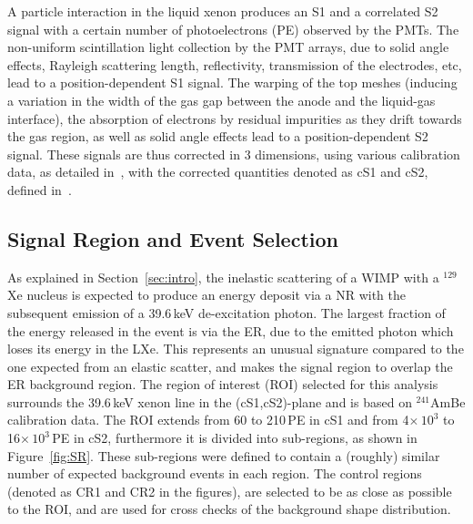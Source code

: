 A particle interaction in the liquid xenon produces an S1 and a correlated S2 signal with a certain number of photoelectrons (PE) observed by the PMTs. The non-uniform scintillation light collection by the PMT arrays, due to solid angle effects, Rayleigh scattering length, reflectivity, transmission of the electrodes, etc, lead to a position-dependent S1 signal. The warping of the top meshes (inducing a variation in the width of the gas gap between the anode and the liquid-gas interface), the absorption of electrons by residual impurities as they drift towards the gas region, as well as solid angle effects lead to a position-dependent S2 signal. These signals are thus corrected in 3 dimensions, using various calibration data, as detailed in~\cite{Aprile:2011dd,Aprile:2012vw}, with the corrected quantities denoted as cS1 and cS2, defined in~\cite{Aprile:2012vw}. 

\subsection{Signal Region and Event Selection} 

As explained in Section~\ref{sec:intro}, the inelastic scattering of a WIMP with a $^{129}$Xe nucleus is expected to produce an energy deposit via a NR with the subsequent emission of  
a 39.6\,keV de-excitation photon. The largest fraction of the energy released in the event is via the ER, due to the emitted photon which loses its energy in the LXe.
This represents an unusual signature compared to the one expected from an elastic scatter, and makes the signal region to overlap the ER background region.
The region of interest (ROI) selected for this analysis surrounds the 39.6\,keV xenon line in the (cS1,cS2)-plane 
and is based on $^{241}$AmBe calibration data. The ROI extends from 60 to 210\,PE in cS1 and from 4$\times \, 10^3$ to 16$\times \, 10^3$\,PE in cS2, furthermore it is divided  into sub-regions, as shown in Figure~\ref{fig:SR}.  These sub-regions were defined to  contain a (roughly) similar number of expected background events in each region. The control regions (denoted as CR1 and CR2 in the figures), are selected to be as close as possible to the ROI,  and are used for cross checks of the background shape distribution.

